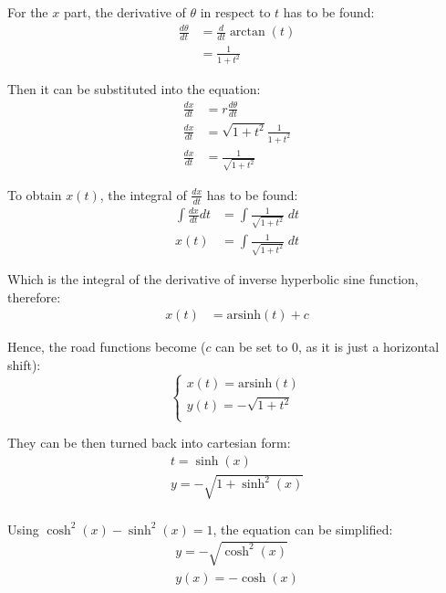 \documentclass[12pt]{article}
\begin{document}
        For the $x$ part, the derivative of $\theta$ in respect to $t$ has to be found:
        \begin{align}
            \frac{d\theta}{dt} &= \frac{d}{dt} \arctan(t) \\
            &= \frac{1}{1+t^2}
        \end{align}

        Then it can be substituted into the equation:
        \begin{align}
            \frac{dx}{dt} &= r \frac{d\theta}{dt} \\
            \frac{dx}{dt} &= \sqrt{1+t^2} \frac{1}{1+t^2} \\
            \frac{dx}{dt} &= \frac{1}{\sqrt{1+t^2}}
        \end{align}

        To obtain $x(t)$, the integral of $\frac{dx}{dt}$ has to be found:
        \begin{align}
            \int \frac{dx}{dt} dt &= \int \frac{1}{\sqrt{1+t^2}} \;dt \\
            x(t) &= \int \frac{1}{\sqrt{1+t^2}} \;dt
        \end{align}

        Which is the integral of the derivative of inverse hyperbolic sine function\cite{oxford_dict}, therefore:
        \begin{align}
            x(t) &= \text{arsinh}(t) + c 
        \end{align}

        Hence, the road functions become ($c$ can be set to 0, as it is just a horizontal shift):
        \begin{equation}\label{eq:road_2}
            \begin{cases}
                x(t) = \text{arsinh}(t) \\
                y(t) = -\sqrt{1+t^2} \\
            \end{cases}
        \end{equation}

        They can be then turned back into cartesian form:
        \begin{align}
            t = \sinh(x) \\
            y = -\sqrt{1+\sinh^2(x)} \\ 
        \end{align}

        Using $\cosh^2(x) - \sinh^2(x) = 1$\cite{oxford_dict}, the equation can be simplified:
        \begin{align}
            y = -\sqrt{\cosh^2(x)} \\
            y(x) = -\cosh(x)
        \end{align}
\end{document}
